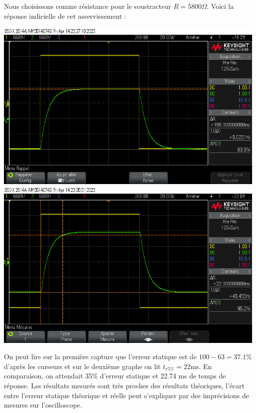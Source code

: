 \documentclass[12pt]{article}
\begin{document}
Nous choisissons comme résistance pour le soustracteur $R= 5800 \Omega$. Voici la réponse indicielle de cet asservissement : 
\begin{center}
    \includegraphics[width = 19cm]{TP3/Syst_1/P/14_04_2023_gs_k1_.png}
    \includegraphics[width = 19cm]{TP3/Syst_1/P/14_04_2023_tr5_k1.png}
\end{center}

On peut lire sur la première capture que l'erreur statique est de $100 - 63 = 37.1\%$ d'après les curseurs et sur le deuxième graphe on lit $t_{r5\%} = 22$ms.
En comparaison, on attendait 35$\%$ d'erreur statique et 22.74 ms de temps de réponse. Les résultats mesurés sont très proches des résultats théoriques, l'écart entre l'erreur statique théorique et réelle peut s'expliquer par des imprécisions de mesures sur l'oscilloscope.
\end{document}
